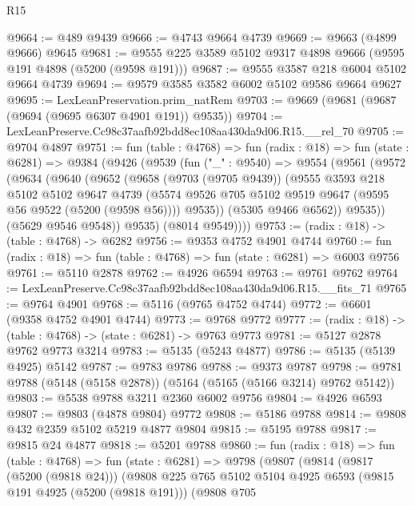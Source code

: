 \begin{lexlean}{R15}
\begin{coremodule}
{{{{{{{{{{{@9664 := @489 @9439
@9666 := @4743 @9664 @4739
@9669 := @9663 (@4899 @9666) @9645
@9681 := @9555 @225 @3589 @5102 @9317 @4898 @9666 (@9595 @191 @4898 (@5200 (@9598 @191)))
@9687 := @9555 @3587 @218 @6004 @5102 @9664 @4739
@9694 := @9579 @3585 @3582 @6002 @5102 @9586 @9664 @9627
@9695 := LexLeanPreservation.prim_natRem
@9703 := @9669 (@9681 (@9687 (@9694 (@9695 @6307 @4901 @191)) @9535))
@9704 := LexLeanPreserve.Cc98c37aafb92bdd8ec108aa430da9d06.R15.__rel_70
@9705 := @9704 @4897
@9751 := fun (table : @4768) =>
  fun (radix : @18) =>
  fun (state : @6281) =>
  @9384
    (@9426
      (@9539
        (fun ("_" : @9540) =>
        @9554
          (@9561
            (@9572
              (@9634
                (@9640
                  (@9652
                    (@9658
                      (@9703 (@9705 @9439))
                      (@9555
                        @3593
                        @218
                        @5102
                        @5102
                        @9647
                        @4739
                        (@5574 @9526 @705 @5102 @9519 @9647 (@9595 @56 @9522 (@5200 (@9598 @56))))
                        @9535))
                    (@5305 @9466 @6562))
                  @9535))
              (@5629 @9546 @9548))
            @9535)
          (@8014 @9549))))
@9753 := (radix : @18) -> (table : @4768) -> @6282
@9756 := @9353 @4752 @4901 @4744
@9760 := fun (radix : @18) => fun (table : @4768) => fun (state : @6281) => @6003 @9756
@9761 := @5110 @2878
@9762 := @4926 @6594
@9763 := @9761 @9762
@9764 := LexLeanPreserve.Cc98c37aafb92bdd8ec108aa430da9d06.R15.__fits_71
@9765 := @9764 @4901
@9768 := @5116 (@9765 @4752 @4744)
@9772 := @6601 (@9358 @4752 @4901 @4744)
@9773 := @9768 @9772
@9777 := (radix : @18) -> (table : @4768) -> (state : @6281) -> @9763 @9773
@9781 := @5127 @2878 @9762 @9773 @3214
@9783 := @5135 (@5243 @4877)
@9786 := @5135 (@5139 @4925) @5142
@9787 := @9783 @9786
@9788 := @9373 @9787
@9798 := @9781 @9788 (@5148 (@5158 @2878)) (@5164 (@5165 (@5166 @3214) @9762 @5142))
@9803 := @5538 @9788 @3211 @2360 @6002 @9756
@9804 := @4926 @6593
@9807 := @9803 (@4878 @9804) @9772
@9808 := @5186 @9788
@9814 := @9808 @432 @2359 @5102 @5219 @4877 @9804
@9815 := @5195 @9788
@9817 := @9815 @24 @4877
@9818 := @5201 @9788
@9860 := fun (radix : @18) =>
  fun (table : @4768) =>
  fun (state : @6281) =>
  @9798
    (@9807
      (@9814
        (@9817 (@5200 (@9818 @24)))
        (@9808
          @225
          @765
          @5102
          @5104
          @4925
          @6593
          (@9815 @191 @4925 (@5200 (@9818 @191)))
          (@9808
            @705
}}}}}}}}}}}
\end{coremodule}
\end{lexlean}
